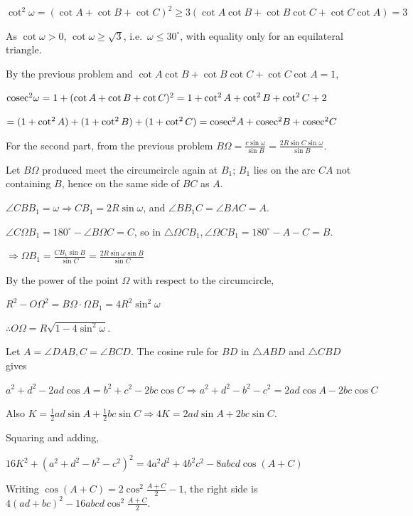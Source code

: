   $\cot^2\omega = (\cot A + \cot B + \cot C)^2\geq 3(\cot A\cot B + \cot B\cot C + \cot C\cot A) = 3$

  As $\cot\omega > 0$, $\cot\omega\geq\sqrt{3}$, i.e.\ $\omega\leq 30^\circ$, with equality only for an
  equilateral triangle.
\item By the previous problem and $\cot A\cot B + \cot B\cot C + \cot C\cot A = 1$,

  ${\rm cosec}^2\omega = 1 + (\cot A + \cot B + \cot C)^2 = 1 + \cot^2A + \cot^2B + \cot^2C + 2$

  $= (1 + \cot^2A) + (1 + \cot^2B) + (1 + \cot^2C) = {\rm cosec}^2A + {\rm cosec}^2B + {\rm cosec}^2C$

  For the second part, from the previous problem $B\Omega = \frac{c\sin\omega}{\sin B} = \frac{2R\sin
  C\sin\omega}{\sin B}$.

  Let $B\Omega$ produced meet the circumcircle again at $B_1$; $B_1$ lies on the arc $CA$ not containing $B$,
  hence on the same side of $BC$ as $A$.

  $\angle CBB_1 = \omega\Rightarrow CB_1 = 2R\sin\omega$, and $\angle BB_1C = \angle BAC = A$.

  $\angle C\Omega B_1 = 180^\circ - \angle B\Omega C = C$, so in $\triangle\Omega CB_1, \angle\Omega CB_1 =
  180^\circ - A - C = B$.

  $\Rightarrow \Omega B_1 = \frac{CB_1\sin B}{\sin C} = \frac{2R\sin\omega\sin B}{\sin C}$

  By the power of the point $\Omega$ with respect to the circumcircle,

  $R^2 - O\Omega^2 = B\Omega\cdot\Omega B_1 = 4R^2\sin^2\omega$

  $\therefore O\Omega = R\sqrt{1 - 4\sin^2\omega}$.
\item Let $A = \angle DAB, C = \angle BCD$. The cosine rule for $BD$ in $\triangle ABD$ and $\triangle CBD$
  gives

  $a^2 + d^2 - 2ad\cos A = b^2 + c^2 - 2bc\cos C\Rightarrow a^2 + d^2 - b^2 - c^2 = 2ad\cos A - 2bc\cos C$

  Also $K = \frac{1}{2}ad\sin A + \frac{1}{2}bc\sin C\Rightarrow 4K = 2ad\sin A + 2bc\sin C$.

  Squaring and adding,

  $16K^2 + (a^2 + d^2 - b^2 - c^2)^2 = 4a^2d^2 + 4b^2c^2 - 8abcd\cos(A + C)$

  Writing $\cos(A + C) = 2\cos^2\frac{A + C}{2} - 1$, the right side is $4(ad + bc)^2 - 16abcd\cos^2\frac{A
  + C}{2}$.


